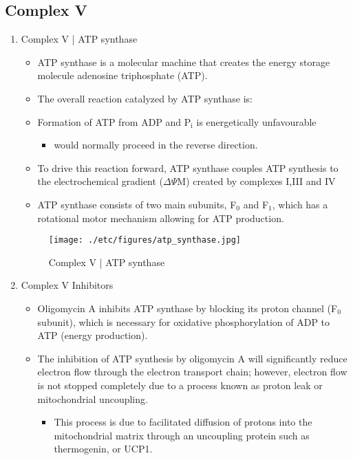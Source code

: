 \documentclass{scrartcl}
\begin{document}
\subsection{Complex V}
\label{sec:org79e039e}
\begin{enumerate}
\item Complex V | ATP synthase
\label{sec:org7790844}

\begin{itemize}
\item ATP synthase is a molecular machine that creates the energy storage
molecule adenosine triphosphate (ATP).

\item The overall reaction catalyzed by ATP synthase is:
\end{itemize}

{\small{}}

\begin{itemize}
\item Formation of ATP from ADP and P\(_{\text{i}}\) is energetically unfavourable
\begin{itemize}
\item would normally proceed in the reverse direction.
\end{itemize}

\item To drive this reaction forward, ATP synthase couples ATP synthesis
to the electrochemical gradient (\(\Delta \Psi\)M) created by complexes
I,III and IV

\item ATP synthase consists of two main subunits, F\(_{\text{0}}\) and F\(_{\text{1}}\), which has a
rotational motor mechanism allowing for ATP production.
\end{itemize}

\begin{figure}[htbp]
\centering
\texttt{[image: ./etc/figures/atp\_synthase.jpg]}
\caption{\label{fig:org6a028d2}
Complex V | ATP synthase}
\end{figure}

\item Complex V Inhibitors
\label{sec:org27da3f7}
\begin{itemize}
\item Oligomycin A inhibits ATP synthase by blocking its proton channel
(F\(_{\text{0}}\) subunit), which is necessary for oxidative phosphorylation of
ADP to ATP (energy production).
\item The inhibition of ATP synthesis by oligomycin A will significantly
reduce electron flow through the electron transport chain; however,
electron flow is not stopped completely due to a process known as
proton leak or mitochondrial uncoupling.
\begin{itemize}
\item This process is due to facilitated diffusion of protons into the
mitochondrial matrix through an uncoupling protein such as
thermogenin, or UCP1.
\end{itemize}


\end{itemize}
\end{enumerate}
\end{document}
